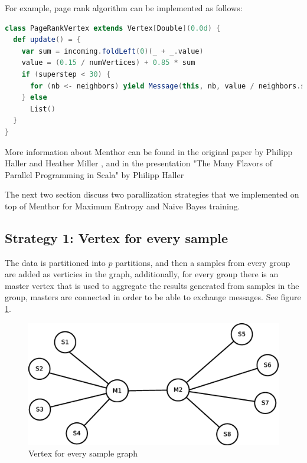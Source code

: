 \documentclass{report}
\begin{document}
For example, page rank algorithm can be implemented as follows:

\begin{lstlisting}[language=scala, caption={Page rank algorithm}, label={listing:pagerank}]
class PageRankVertex extends Vertex[Double](0.0d) {
  def update() = {
    var sum = incoming.foldLeft(0)(_ + _.value)
    value = (0.15 / numVertices) + 0.85 * sum
    if (superstep < 30) {
      for (nb <- neighbors) yield Message(this, nb, value / neighbors.size)
    } else
      List()
  }
}
\end{lstlisting}

More information about Menthor can be found in the original paper by Philipp Haller and Heather Miller \cite{oai:infoscience.epfl.ch:165111}, and in the presentation "The Many Flavors of Parallel Programming in Scala" by Philipp Haller \cite{scalaparallel}

The next two section discuss two parallization strategies that we implemented on top of Menthor for Maximum Entropy and Naive Bayes training.

\subsection{Strategy 1: Vertex for every sample}

The data is partitioned into $p$ partitions, and then a samples from every group are added as verticies in the graph, additionally, for every group there is an master vertex that is used to aggregate the results generated from samples in the group, masters are connected in order to be able to exchange messages. See figure \ref{fig:vs:graph1}.

\begin{figure}[!htb]
  \centering
  \includegraphics*[scale=0.40]{graph1.eps}
  \caption{Vertex for every sample graph}
  \label{fig:vs:graph1}
\end{figure}
\end{document}
